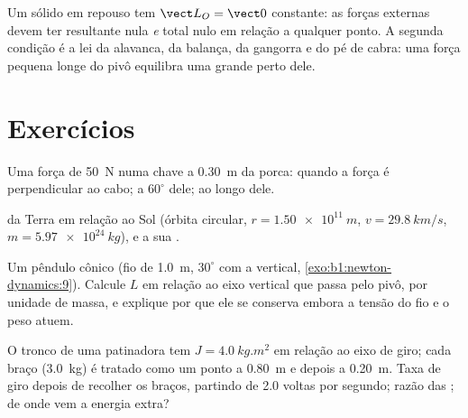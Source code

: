 \begin{remark}[Estática]\label{rem:b1:angular-momentum:statics}
Um sólido em repouso tem $\vect L_O = \vect 0$ constante: as forças externas
devem ter resultante nula \emph{e}  total nulo em relação a qualquer ponto.
A segunda condição é a lei da alavanca, da balança, da gangorra e
do pé de cabra: uma força pequena longe do pivô equilibra uma grande perto
dele.
\end{remark}

\section{Exercícios}

\begin{exercise}[$\star$]\label{exo:b1:angular-momentum:1}
Uma força de \qty{50}{N} numa chave a \qty{0.30}{m} da porca:  quando
a força é perpendicular ao cabo; a $60^\circ$ dele; ao longo
dele.
\end{exercise}

\begin{exercise}[$\star$]\label{exo:b1:angular-momentum:2}
 da Terra em relação ao Sol (órbita circular,
$r = \qty{1.50e11}{m}$, $v = \qty{29.8}{km/s}$, $m = \qty{5.97e24}{kg}$),
e a sua .
\end{exercise}

\begin{exercise}[$\star$]\label{exo:b1:angular-momentum:3}
Um pêndulo cônico (fio de \qty{1.0}{m}, $30^\circ$ com a vertical,
\cref{exo:b1:newton-dynamics:9}). Calcule $L$ em relação ao eixo vertical
que passa pelo pivô, por unidade de massa, e explique por que ele se conserva
embora a tensão do fio e o peso atuem.
\end{exercise}

\begin{exercise}[$\star$]\label{exo:b1:angular-momentum:4}
O tronco de uma patinadora tem $J = \qty{4.0}{kg.m^2}$ em relação ao eixo de giro; cada
braço (\qty{3.0}{kg}) é tratado como um ponto a \qty{0.80}{m} e depois a
\qty{0.20}{m}. Taxa de giro depois de recolher os braços, partindo de
\qty{2.0}{} voltas por segundo; razão das ; de onde vem a
energia extra?
\end{exercise}

